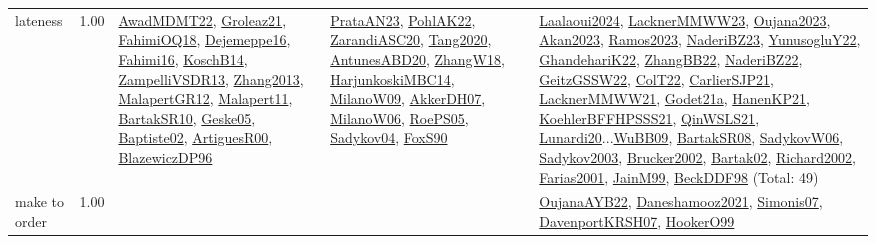 {\begin{longtable}{p{3cm}r>{\raggedright\arraybackslash}p{6cm}>{\raggedright\arraybackslash}p{6cm}>{\raggedright\arraybackslash}p{8cm}}
\index{lateness}\index{Concepts!lateness}lateness &  1.00 & \hyperref[detail:AwadMDMT22]{AwadMDMT22}, \hyperref[detail:Groleaz21]{Groleaz21}, \hyperref[detail:FahimiOQ18]{FahimiOQ18}, \hyperref[detail:Dejemeppe16]{Dejemeppe16}, \hyperref[detail:Fahimi16]{Fahimi16}, \hyperref[detail:KoschB14]{KoschB14}, \hyperref[detail:ZampelliVSDR13]{ZampelliVSDR13}, \hyperref[detail:Zhang2013]{Zhang2013}, \hyperref[detail:MalapertGR12]{MalapertGR12}, \hyperref[detail:Malapert11]{Malapert11}, \hyperref[detail:BartakSR10]{BartakSR10}, \hyperref[detail:Geske05]{Geske05}, \hyperref[detail:Baptiste02]{Baptiste02}, \hyperref[detail:ArtiguesR00]{ArtiguesR00}, \hyperref[detail:BlazewiczDP96]{BlazewiczDP96} & \hyperref[detail:PrataAN23]{PrataAN23}, \hyperref[detail:PohlAK22]{PohlAK22}, \hyperref[detail:ZarandiASC20]{ZarandiASC20}, \hyperref[detail:Tang2020]{Tang2020}, \hyperref[detail:AntunesABD20]{AntunesABD20}, \hyperref[detail:ZhangW18]{ZhangW18}, \hyperref[detail:HarjunkoskiMBC14]{HarjunkoskiMBC14}, \hyperref[detail:MilanoW09]{MilanoW09}, \hyperref[detail:AkkerDH07]{AkkerDH07}, \hyperref[detail:MilanoW06]{MilanoW06}, \hyperref[detail:RoePS05]{RoePS05}, \hyperref[detail:Sadykov04]{Sadykov04}, \hyperref[detail:FoxS90]{FoxS90} & \hyperref[detail:Laalaoui2024]{Laalaoui2024}, \hyperref[detail:LacknerMMWW23]{LacknerMMWW23}, \hyperref[detail:Oujana2023]{Oujana2023}, \hyperref[detail:Akan2023]{Akan2023}, \hyperref[detail:Ramos2023]{Ramos2023}, \hyperref[detail:NaderiBZ23]{NaderiBZ23}, \hyperref[detail:YunusogluY22]{YunusogluY22}, \hyperref[detail:GhandehariK22]{GhandehariK22}, \hyperref[detail:ZhangBB22]{ZhangBB22}, \hyperref[detail:NaderiBZ22]{NaderiBZ22}, \hyperref[detail:GeitzGSSW22]{GeitzGSSW22}, \hyperref[detail:ColT22]{ColT22}, \hyperref[detail:CarlierSJP21]{CarlierSJP21}, \hyperref[detail:LacknerMMWW21]{LacknerMMWW21}, \hyperref[detail:Godet21a]{Godet21a}, \hyperref[detail:HanenKP21]{HanenKP21}, \hyperref[detail:KoehlerBFFHPSSS21]{KoehlerBFFHPSSS21}, \hyperref[detail:QinWSLS21]{QinWSLS21}, \hyperref[detail:Lunardi20]{Lunardi20}...\hyperref[detail:WuBB09]{WuBB09}, \hyperref[detail:BartakSR08]{BartakSR08}, \hyperref[detail:SadykovW06]{SadykovW06}, \hyperref[detail:Sadykov2003]{Sadykov2003}, \hyperref[detail:Brucker2002]{Brucker2002}, \hyperref[detail:Bartak02]{Bartak02}, \hyperref[detail:Richard2002]{Richard2002}, \hyperref[detail:Farias2001]{Farias2001}, \hyperref[detail:JainM99]{JainM99}, \hyperref[detail:BeckDDF98]{BeckDDF98} (Total: 49)\\
\index{make to order}\index{Concepts!make to order}make to order &  1.00 &  &  & \hyperref[detail:OujanaAYB22]{OujanaAYB22}, \hyperref[detail:Daneshamooz2021]{Daneshamooz2021}, \hyperref[detail:Simonis07]{Simonis07}, \hyperref[detail:DavenportKRSH07]{DavenportKRSH07}, \hyperref[detail:HookerO99]{HookerO99}\\

\end{longtable}}
